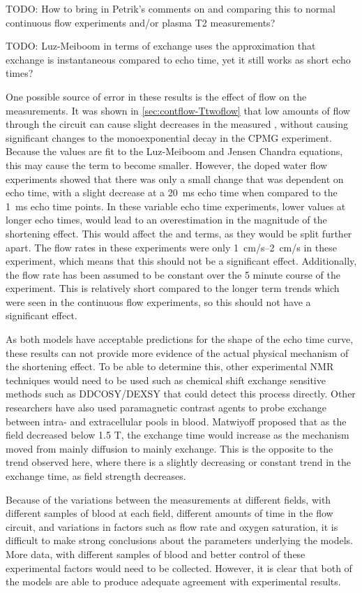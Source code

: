TODO: How to bring in Petrik's comments on \TtwoO and comparing this to normal continuous flow experiments and/or plasma T2 measurements?

TODO: Luz-Meiboom in terms of exchange uses the approximation that exchange is instantaneous compared to echo time, yet it still works as short echo times?

One possible source of error in these results is the effect of flow on the \Ttwo measurements.
It was shown in \autoref{sec:contflow-Ttwoflow} that low amounts of flow through the circuit can cause slight decreases in the measured \Ttwo, without causing significant changes to the monoexponential decay in the CPMG experiment.
Because the \Ttwo values are fit to the Luz-Meiboom and Jensen Chandra equations, this may cause the \TtwoO term to become smaller.
However, the doped water flow experiments showed that there was only a small change that was dependent on echo time, with a slight decrease at a \SI{20}{ms} echo time when compared to the \SI{1}{ms} echo time points.
In these variable echo time experiments, lower \Ttwo values at longer echo times, would lead to an overestimation in the magnitude of the \Ttwo shortening effect.
This would affect the \Kzero and \Gzero terms, as they would be split further apart.
The flow rates in these experiments were only \SIrange{1}{2}{cm/s} in these experiment, which means that this should not be a significant effect.
Additionally, the flow rate has been assumed to be constant over the 5 minute course of the experiment.
This is relatively short compared to the longer term trends which were seen in the continuous flow experiments, so this should not have a significant effect.

As both models have acceptable predictions for the shape of the echo time curve, these results can not provide more evidence of the actual physical mechanism of the \Ttwo shortening effect.
To be able to determine this, other experimental NMR techniques would need to be used such as chemical shift exchange sensitive methods such as DDCOSY/DEXSY that could detect this process directly.
Other researchers have also used paramagnetic contrast agents to probe exchange between intra- and extracellular pools in blood\cite{LiIntegratedanalysisdiffusion1998}.
Matwiyoff \cite{Matwiyofflineshapeswater1990} proposed that as the field decreased below 1.5 T, the exchange time would increase as the mechanism moved from mainly diffusion to mainly exchange.
This is the opposite to the trend observed here, where there is a slightly decreasing or constant trend in the exchange time, as field strength decreases.

Because of the variations between the measurements at different fields, with different samples of blood at each field, different amounts of time in the flow circuit, and variations in factors such as flow rate and oxygen saturation, it is difficult to make strong conclusions about the parameters underlying the models.
More data, with different samples of blood and better control of these experimental factors would need to be collected.
However, it is clear that both of the models are able to produce adequate agreement with experimental results.
